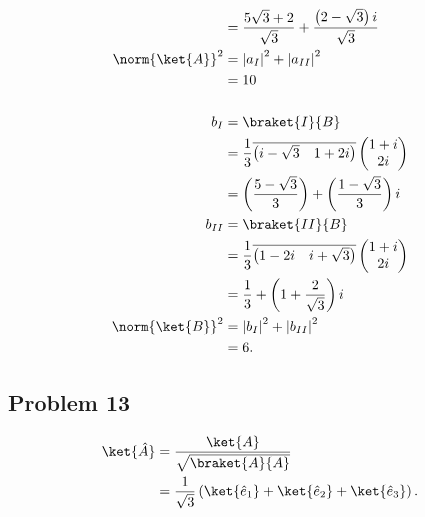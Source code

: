 \documentclass[10pt]{mypackage}
\begin{document}
\begin{enumerate}[(a)]
\begin{align*}
             &= \frac{5\sqrt{3} + 2}{\sqrt{3}} + \frac{\left(2-\sqrt{3}\right)i}{\sqrt{3}}\\
      \norm{\ket{A}}^2 &= \left\vert a_{I} \right\vert^2 + \left\vert a_{II} \right\vert^2\\
                       &= 10\\
                       \\
      b_{I} &= \braket{I}{B}\\
            &= \frac{1}{3} \overline{ \begin{pmatrix}i-\sqrt{3} & 1 + 2i\end{pmatrix} } \begin{pmatrix}1+i\\2i\end{pmatrix}\\
            &= \left(\frac{5-\sqrt{3}}{3}\right) + \left(\frac{1-\sqrt{3}}{3}\right)i\\
      b_{II} &= \braket{II}{B}\\
             &= \frac{1}{3} \overline{ \begin{pmatrix}1-2i & i + \sqrt{3}\end{pmatrix} } \begin{pmatrix}1+i\\2i\end{pmatrix}\\
             &= \frac{1}{3} + \left(1 + \frac{2}{\sqrt{3}}\right)i\\
      \norm{\ket{B}}^2 &= \left\vert b_{I} \right\vert^2 + \left\vert b_{II} \right\vert^2\\
                       &= 6.
    \end{align*}
    
\end{enumerate}
\subsection{Problem 13}%
\begin{align*}
  \ket{\hat{A}} &= \frac{\ket{A}}{\sqrt{\braket{A}{A}}}\\
                &= \frac{1}{\sqrt{3}}\left(\ket{\hat{e}_1} + \ket{\hat{e}_2} + \ket{\hat{e}_{3}}\right).
\end{align*}
\end{document}
